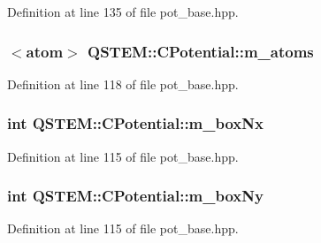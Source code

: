 Definition at line 135 of file pot\-\_\-base.\-hpp.

\hypertarget{class_q_s_t_e_m_1_1_c_potential_ad811b5a6c1770a7b4cb9a86dd4f099b4}{
\subsubsection[{m\-\_\-atoms}]{$<${\bf atom}$>$ Q\-S\-T\-E\-M\-::\-C\-Potential\-::m\-\_\-atoms\hspace{0.3cm}{\ttfamily [protected]}}}\label{class_q_s_t_e_m_1_1_c_potential_ad811b5a6c1770a7b4cb9a86dd4f099b4}


Definition at line 118 of file pot\-\_\-base.\-hpp.

\hypertarget{class_q_s_t_e_m_1_1_c_potential_a069ef251874998b274ed41a973bb0280}{
\subsubsection[{m\-\_\-box\-Nx}]{\setlength{\rightskip}{0pt plus 5cm}int Q\-S\-T\-E\-M\-::\-C\-Potential\-::m\-\_\-box\-Nx\hspace{0.3cm}{\ttfamily [protected]}}}\label{class_q_s_t_e_m_1_1_c_potential_a069ef251874998b274ed41a973bb0280}


Definition at line 115 of file pot\-\_\-base.\-hpp.

\hypertarget{class_q_s_t_e_m_1_1_c_potential_a17fbaa483bd98f3776ad078f13952aeb}{
\subsubsection[{m\-\_\-box\-Ny}]{\setlength{\rightskip}{0pt plus 5cm}int Q\-S\-T\-E\-M\-::\-C\-Potential\-::m\-\_\-box\-Ny\hspace{0.3cm}{\ttfamily [protected]}}}\label{class_q_s_t_e_m_1_1_c_potential_a17fbaa483bd98f3776ad078f13952aeb}


Definition at line 115 of file pot\-\_\-base.\-hpp.

